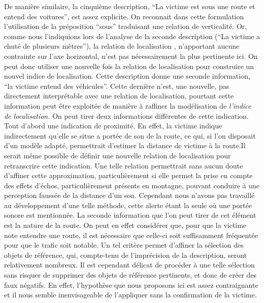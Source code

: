 De manière similaire, la cinquième description, \enquote{La victime
  est sous une route et entend des voitures}, est assez explicite. On
reconnait dans cette formulation l'utilisation de la préposition
\enquote{sous} traduisant une relation de verticalité. Or, comme nous
l'indiquions lors de l'analyse de la seconde description (\enquote{La
  victime a chuté de plusieurs mètres}), la relation de localisation
, n'apportant aucune contrainte sur l'axe
horizontal, n'est pas nécessairement la plus pertinente ici. On peut
donc utiliser une nouvelle fois la relation de localisation
 pour construire un nouvel indice de
localisation. Cette description donne une seconde information,
\enquote{la victime entend des véhicules}. Cette dernière n'est, une
nouvelle, pas directement interprétable avec une relation de
localisation, pourtant cette information peut être exploitée de
manière à raffiner la modélisation de \emph{l'indice de localisation.}
On peut tirer deux informations différentes de cette indication. Tout
d'abord une indication de proximité. En effet, la victime indique
indirectement qu'elle se situe a portée de son de la route, ce qui, si
l'on disposait d'un modèle adapté, permettrait d'estimer la distance
de victime à la route.Il serait même possible de définir une nouvelle
relation de localisation  pour retranscrire
cette indication. Une telle relation permettrait sans aucun doute
d'affiner cette approximation, particulièrement si elle permet la
prise en compte des effets d’échos, particulièrement présents en
montagne, pouvant conduire à une perception faussée de la distance
d'un son. Cependant nous n'avons pas travaillé au développement d'une
telle méthode, cette alerte étant la seule où une portée sonore est
mentionnée. La seconde information que l'on peut tirer de cet élément
est la nature de la route. On peut en effet considérer que, pour que
la victime note entendre une route, il est nécessaire que celle-ci
soit suffisamment fréquentée pour que le trafic soit notable. Un tel
critère permet d'affiner la sélection des objets de référence, qui,
compte-tenu de l’imprécision de la description, seront relativement
nombreux. Il est cependant délicat de procéder à une telle sélection
sans risquer de supprimer des objets de référence pertinents, et donc
de créer des faux négatifs. En effet, l'hypothèse que nous proposons
ici est assez contraignante et il nous semble inenvisageable de
l'appliquer sans la confirmation de la victime.

